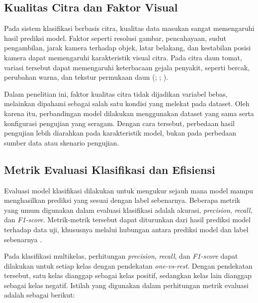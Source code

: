 \begin{sectioncontent}
    \subsection{Kualitas Citra dan Faktor Visual}
    \begin{subsectioncontent}
        \hspace{\parindent}Pada sistem klasifikasi berbasis citra, kualitas data masukan sangat memengaruhi hasil prediksi model. Faktor seperti resolusi gambar, pencahayaan, sudut pengambilan, jarak kamera terhadap objek, latar belakang, dan kestabilan posisi kamera dapat memengaruhi karakteristik visual citra. Pada citra daun tomat, variasi tersebut dapat memengaruhi keterbacaan gejala penyakit, seperti bercak, perubahan warna, dan tekstur permukaan daun (\citealp[hlm. 1]{imtiaz2025dataset}; \citealp[hlm. 1--2]{oni2025dataset}; \citealp[hlm. 1--2]{liu2025dataset}).

        Dalam penelitian ini, faktor kualitas citra tidak dijadikan variabel bebas, melainkan dipahami sebagai salah satu kondisi yang melekat pada dataset. Oleh karena itu, perbandingan model dilakukan menggunakan dataset yang sama serta konfigurasi pengujian yang seragam. Dengan cara tersebut, perbedaan hasil pengujian lebih diarahkan pada karakteristik model, bukan pada perbedaan sumber data atau skenario pengujian.
    \end{subsectioncontent}


    \subsection{Metrik Evaluasi Klasifikasi dan Efisiensi}
    \begin{subsectioncontent}
        \hspace{\parindent}Evaluasi model klasifikasi dilakukan untuk mengukur sejauh mana model mampu menghasilkan prediksi yang sesuai dengan label sebenarnya. Beberapa metrik yang umum digunakan dalam evaluasi klasifikasi adalah akurasi, \textit{precision}, \textit{recall}, dan \textit{F1-score}. Metrik-metrik tersebut dapat diturunkan dari hasil prediksi model terhadap data uji, khususnya melalui hubungan antara prediksi model dan label sebenarnya \citep{powers2011evaluation,grandini2020metrics}.

        Pada klasifikasi multikelas, perhitungan \textit{precision}, \textit{recall}, dan \textit{F1-score} dapat dilakukan untuk setiap kelas dengan pendekatan \textit{one-vs-rest}. Dengan pendekatan tersebut, satu kelas dianggap sebagai kelas positif, sedangkan kelas lain dianggap sebagai kelas negatif. Istilah yang digunakan dalam perhitungan metrik evaluasi adalah sebagai berikut:


\end{subsectioncontent}
\end{sectioncontent}
